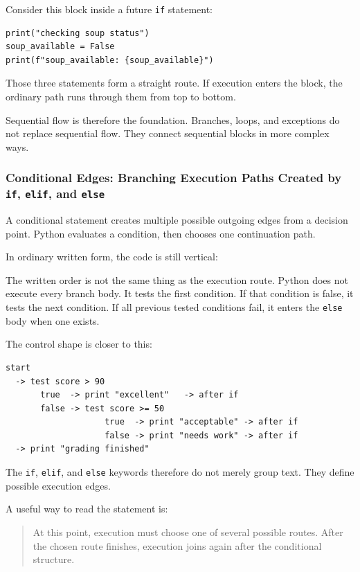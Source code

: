 Consider this block inside a future \texttt{if} statement:

\begin{verbatim}
print("checking soup status")
soup_available = False
print(f"soup_available: {soup_available}")
\end{verbatim}

Those three statements form a straight route. If execution enters the block, the ordinary path runs through them from top to bottom.

Sequential flow is therefore the foundation. Branches, loops, and exceptions do not replace sequential flow. They connect sequential blocks in more complex ways.

\subsubsection{Conditional Edges: Branching Execution Paths Created by \texttt{if}, \texttt{elif}, and \texttt{else}}

A conditional statement creates multiple possible outgoing edges from a decision point. Python evaluates a condition, then chooses one continuation path.

In ordinary written form, the code is still vertical:

The written order is not the same thing as the execution route. Python does not execute every branch body. It tests the first condition. If that condition is false, it tests the next condition. If all previous tested conditions fail, it enters the \texttt{else} body when one exists.

The control shape is closer to this:

\begin{verbatim}
start
  -> test score > 90
       true  -> print "excellent"   -> after if
       false -> test score >= 50
                    true  -> print "acceptable" -> after if
                    false -> print "needs work" -> after if
  -> print "grading finished"
\end{verbatim}

The \texttt{if}, \texttt{elif}, and \texttt{else} keywords therefore do not merely group text. They define possible execution edges.

A useful way to read the statement is:

\begin{quote}
At this point, execution must choose one of several possible routes. After the chosen route finishes, execution joins again after the conditional structure.
\end{quote}

